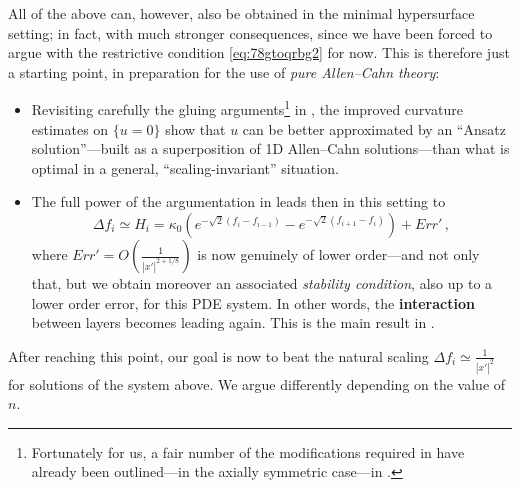 \documentclass{article}
\theoremstyle{definition}
\begin{document}
    All of the above can, however, also be obtained in the minimal hypersurface setting; in fact, with much stronger consequences, since we have been forced to argue with the restrictive condition \eqref{eq:78gtoqrbg2} for now. This is therefore just a starting point, in preparation for the use of \textit{pure Allen--Cahn theory}:
    \begin{itemize}
    \item Revisiting carefully the gluing arguments\footnote{Fortunately for us, a fair number of the modifications required in \cite{WW19,WW18} have already been outlined---in the axially symmetric case---in \cite{GuiWangWei2020}.} in \cite{WW19,WW18}, the improved curvature estimates on $\{u=0\}$ show that $u$ can be better approximated by an ``Ansatz solution''---built as a superposition of 1D Allen--Cahn solutions---than what is optimal in a general, ``scaling-invariant'' situation.
    
    \item The full power of the argumentation in \cite{WW19} leads then in this setting to 
    $$
\Delta f_i\simeq H_i=\kappa_0 \left(e^{-\sqrt{2}(f_i - f_{i-1})} - e^{-\sqrt{2}(f_{i+1} - f_i)}\right)+Err'\,,
$$
where $Err'=O(\frac{1}{|x'|^{2+1/8}})$ is now genuinely of lower order---and not only that, but we obtain moreover an associated {\it stability condition}, also up to a lower order error, for this PDE system. In other words, the \textbf{interaction} between layers becomes leading again. This is the main result in .
\end{itemize}
After reaching this point, our goal is now to beat the natural scaling $\Delta f_i\simeq \frac{1}{|x'|^2}$ for solutions of the system above. We argue differently depending on the value of $n$. 
\end{document}
